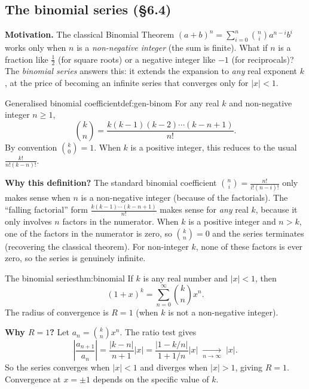 \subsection{The binomial series (\S6.4)}

\noindent\textbf{Motivation.}
The classical Binomial Theorem $(a+b)^n=\sum_{i=0}^{n}\binom{n}{i}a^{n-i}b^i$ works only when $n$ is a \emph{non-negative integer} (the sum is finite).
What if $n$ is a fraction like $\frac12$ (for square roots) or a negative integer like $-1$ (for reciprocals)?
The \emph{binomial series} answers this: it extends the expansion to \emph{any} real exponent $k$, at the price of becoming an infinite series that converges only for $|x|<1$.

\begin{definition}{Generalised binomial coefficient}{def:gen-binom}
For any real $k$ and non-negative integer $n\ge 1$,
\[
\binom{k}{n}=\frac{k(k-1)(k-2)\cdots(k-n+1)}{n!}.
\]
By convention $\binom{k}{0}=1$.
When $k$ is a positive integer, this reduces to the usual $\frac{k!}{n!(k-n)!}$.
\end{definition}

\noindent\textbf{Why this definition?}
The standard binomial coefficient $\binom{n}{i}=\frac{n!}{i!(n-i)!}$ only makes sense when $n$ is a non-negative integer (because of the factorials).
The ``falling factorial'' form $\frac{k(k-1)\cdots(k-n+1)}{n!}$ makes sense for \emph{any} real $k$, because it only involves $n$ factors in the numerator.
When $k$ is a positive integer and $n>k$, one of the factors in the numerator is zero, so $\binom{k}{n}=0$ and the series terminates (recovering the classical theorem).
For non-integer $k$, none of these factors is ever zero, so the series is genuinely infinite.

\begin{theorem}{The binomial series}{thm:binomial}
If $k$ is any real number and $|x|<1$, then
\[
(1+x)^k = \sum_{n=0}^{\infty}\binom{k}{n}x^n.
\]
The radius of convergence is $R=1$ (when $k$ is not a non-negative integer).
\end{theorem}

\noindent\textbf{Why $R=1$?}
Let $a_n=\binom{k}{n}x^n$. The ratio test gives
\[
\left|\frac{a_{n+1}}{a_n}\right|
=\frac{|k-n|}{n+1}|x|
=\frac{|1-k/n|}{1+1/n}|x|
\;\xrightarrow[n\to\infty]{}\;|x|.
\]
So the series converges when $|x|<1$ and diverges when $|x|>1$, giving $R=1$.
Convergence at $x=\pm 1$ depends on the specific value of $k$.

